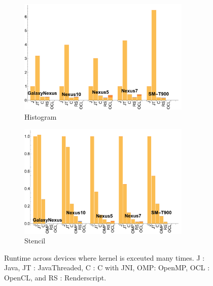 \begin{figure}[t]
  \begin{subfigure}[b]{0.5\textwidth}
      \centering
      \includegraphics[width=0.9\textwidth]{data/Histogram_time.pdf}
      \caption{Histogram}\label{fig:histo}
  \end{subfigure}
  \begin{subfigure}[b]{0.5\textwidth}
      \centering
      \includegraphics[width=0.9\textwidth]{data/Stencil_time.pdf}
      \caption{Stencil}
      \label{fig:Stencil}
  \end{subfigure}

  \caption{Runtime across devices where kernel is exceuted many times. J : Java, JT : JavaThreaded, C : C with JNI, OMP: OpenMP, OCL : OpenCL, and RS : Renderscript.}
\end{figure}
\FloatBarrier